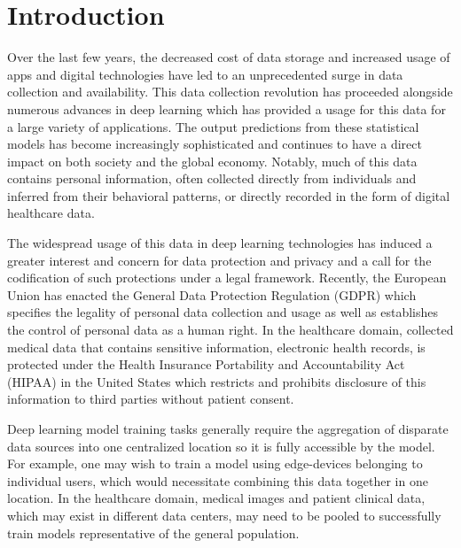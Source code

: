 \documentclass[twocolumn, switch]{article} %
\begin{document}

\section{Introduction}

Over the last few years, the decreased cost of data storage and increased usage of apps and digital technologies have led to an unprecedented surge in data collection and availability. This data collection revolution has proceeded alongside numerous advances in deep learning which has provided a usage for this data for a large variety of applications. The output predictions from these statistical models has become increasingly sophisticated and continues to have a direct impact on both society and the global economy. Notably, much of this data contains personal information, often collected directly from individuals and inferred from their behavioral patterns, or directly recorded in the form of digital healthcare data.

The widespread usage of this data in deep learning technologies has induced a greater interest and concern for data protection and privacy and a call for the codification of such protections under a legal framework. Recently, the European Union has enacted the General Data Protection Regulation (GDPR) \cite{gdpr, gpdr_url} which specifies the legality of personal data collection and usage as well as establishes the control of personal data as a human right. In the healthcare domain, collected medical data that contains sensitive information, electronic health records, is protected under the Health Insurance Portability and Accountability Act (HIPAA) in the United States which restricts and prohibits disclosure of this information to third parties without patient consent. 

Deep learning model training tasks generally require the aggregation of disparate data sources into one centralized location so it is fully accessible by the model. For example, one may wish to train a model using edge-devices belonging to individual users, which would necessitate combining this data together in one location. In the healthcare domain, medical images and patient clinical data, which may exist in different data centers, may need to be pooled to successfully train models representative of the general population. 
\end{document}
